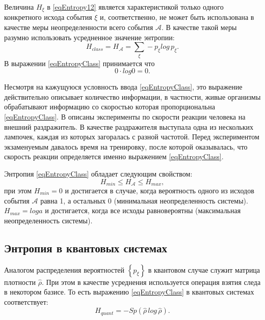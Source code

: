 Величина $H_{\xi}$ в \eqref{eqEntropy12} является характеристикой
только одного конкретного исхода события $\xi$ и, соответственно, не
может быть использована в качестве меры неопределенности всего события
$\mathcal{A}$. В качестве такой меры разумно использовать усредненное
значение энтропии:
\begin{equation}
H_{class} = H_{\mathcal{A}} = \sum_{\xi} - p_{\xi} log \, p_{\xi}.
\label{eqEntropyClass}
\end{equation}
В выражении \eqref{eqEntropyClass} принимается что
\begin{equation}
0 \cdot log 0 = 0.
\label{eqEntropyClassAdd}
\end{equation}

Несмотря на кажущуюся условность ввода \eqref{eqEntropyClass}, это
выражение действительно описывает количество информации, в частности,
живые организмы обрабатывают информацию со скоростью которая
пропорциональна \eqref{eqEntropyClass}. В \cite{bYaglom} 
описаны эксперименты по скорости реакции человека
на внешний раздражитель. В качестве раздражителя выступала одна из нескольких
лампочек, каждая из которых загоралась с разной частотой. Перед
экспериментом экзаменуемым давалось время на тренировку, после которой оказывалась,
что скорость реакции определяется именно выражением \eqref{eqEntropyClass}.

Энтропия \eqref{eqEntropyClass} обладает следующим свойством:
\begin{equation}
H_{min} \le H_{\mathcal{A}} \le H_{max},
\label{eqEntropyClassProperty}
\end{equation}
при этом $H_{min} = 0$ и достигается в случае, когда вероятность одного
из исходов события $\mathcal{A}$ равна 1, а остальных 0 (минимальная
неопределенность системы). $H_{max} = log a$ и достигается, когда все
исходы равновероятны (максимальная неопределенность системы).

\subsection{Энтропия в квантовых системах}

Аналогом распределения вероятностей $\left\{p_{\xi}\right\}$ в
квантовом случае служит матрица плотности 
$\hat{\rho}$. При этом в
качестве усреднения используется операция взятия следа в некотором
базисе. То есть выражению \eqref{eqEntropyClass} в квантовых системах
соответствует:
\begin{equation}
H_{quant} = - Sp \left(\hat{\rho} \, log \, \hat{\rho}\right).
\label{eqEntropyQuant}
\end{equation}

